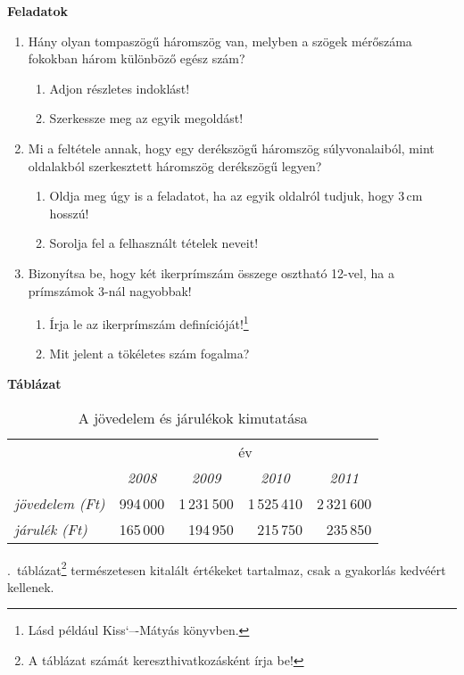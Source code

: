 \documentclass[a4paper,12pt]{article}
\begin{document}
\begin{center}
	\textbf{Feladatok}
\end{center}
\begin{enumerate}
	\item Hány olyan tompaszögű háromszög van, melyben a szögek mérőszáma fokokban három különböző egész szám?
	\begin{enumerate}
		\item Adjon részletes indoklást!
		\item Szerkessze meg az egyik megoldást!
	\end{enumerate}
	\item Mi a feltétele annak, hogy egy derékszögű háromszög súlyvonalaiból, mint oldalakból szerkesztett háromszög derékszögű legyen?
	\begin{enumerate}
		\item Oldja meg úgy is a feladatot, ha az egyik oldalról tudjuk, hogy 3\,cm hosszú!
		\item Sorolja fel a felhasznált tételek neveit!
	\end{enumerate}
	\item Bizonyítsa be, hogy két ikerprímszám összege osztható 12-vel, ha a prímszámok 3-nál nagyobbak!
	\begin{enumerate}
		\item Írja le az ikerprímszám definícióját!\footnote{Lásd például Kiss`–-Mátyás könyvben.}
		\item Mit jelent a tökéletes szám fogalma?
	\end{enumerate}
\end{enumerate}
\begin{center}
	\textbf{Táblázat}
\end{center}
\begin{table}[!ht]
\centering
	\begin{tabular}{|l|r|r|r|r|}
	\multicolumn{1}{c}{}&\multicolumn{4}{c}{év} \\
	\cline{2-5}
	\multicolumn{1}{c|}{}&\multicolumn{1}{c}{\emph{2008}}&\multicolumn{1}{c}{\emph{2009}}&\multicolumn{1}{c}{\emph{2010}}&\multicolumn{1}{c|}{\emph{2011}}\\
	\hline
	\emph{jövedelem (Ft)}& 994\,000 & 1\,231\,500 & 1\,525\,410 & 2\,321\,600 \\
	\emph{járulék (Ft)}& 165\,000 & 194\,950 & 215\,750 & 235\,850 \\
	\hline
\end{tabular}
\caption{A jövedelem és járulékok kimutatása}
\label{table-jovedelem}
\end{table}
\Az{\ref{table-jovedelem}}.~táblázat\footnote{A táblázat számát kereszthivatkozásként írja be!} természetesen kitalált értékeket tartalmaz, csak a gyakorlás kedvéért kellenek.
\end{document}
